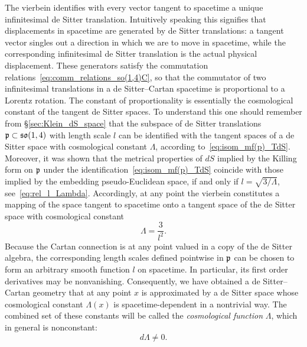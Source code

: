 \documentclass[
final,
11pt,
a4paper,
DIV=11,
headinclude=true,
footinclude=false,
bibliography=totoc,
twoside=true,  %
BCOR=5mm
]{scrbook}
\begin{document}
The vierbein identifies with every vector tangent to spacetime 
a unique infinitesimal de Sitter translation. Intuitively 
speaking this signifies that displacements in spacetime are 
generated by de Sitter translations: a tangent vector singles out 
a direction in which we are to move in spacetime, while the 
corresponding infinitesimal de Sitter translation is the actual 
physical displacement. These generators satisfy the commutation 
relations~\eqref{eq:comm_relations_so(1,4)C}, so that the 
commutator of two infinitesimal translations in a de 
Sitter--Cartan spacetime is proportional to a Lorentz rotation.  
The constant of proportionality is essentially the cosmological 
constant of the tangent de Sitter spaces. To understand this one 
should remember from \S\ref{sec:Klein_dS_space} that the subspace 
of de Sitter translations $\mathfrak{p} \subset \mathfrak{so}(1,4)$ with 
length scale $l$ can be identified with the tangent spaces of 
a de Sitter space with cosmological constant $\Lambda$, according 
to~\eqref{eq:isom_mf(p)_TdS}. Moreover, it was shown that the 
metrical properties of $dS$ implied by the Killing form on 
$\mathfrak{p}$ under the identification~\eqref{eq:isom_mf(p)_TdS} 
coincide with those implied by the embedding pseudo-Euclidean 
space, if and only if $l = \sqrt{3/\Lambda}$, 
see~\eqref{eq:rel_l_Lambda}. Accordingly, at any point the 
vierbein constitutes a mapping of the space tangent to spacetime 
onto a tangent space of the de Sitter space with cosmological 
constant
\begin{equation}
  \Lambda = \frac{3}{l^2}.
\end{equation}
Because the Cartan connection is at any point valued in a copy of 
the de Sitter algebra, the corresponding length scales defined 
pointwise in $\mathfrak{p}$ can be chosen to form an arbitrary smooth 
function $l$ on spacetime. In particular, its first order 
derivatives may be nonvanishing. Consequently, we have obtained 
a de Sitter--Cartan geometry that at any point $x$ is 
approximated by a de Sitter space whose cosmological constant 
$\Lambda(x)$ is spacetime-dependent in a nontrivial way. The 
combined set of these constants will be called the 
\emph{cosmological function} $\Lambda$, which in general is 
nonconstant:
\begin{equation*}
  d\Lambda \neq 0.
\end{equation*}
\end{document}

